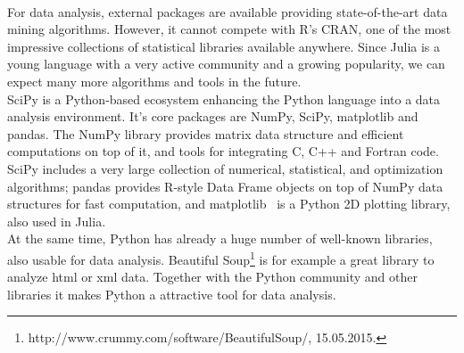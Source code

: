 \\
For data analysis, external packages are available providing state-of-the-art data mining algorithms. However, it cannot compete with R's CRAN, one of the most impressive collections of statistical libraries available anywhere. Since Julia is a young language with a very active community and a growing popularity, we can expect many more algorithms and tools in the future.
\\
SciPy is a Python-based ecosystem enhancing the Python language into a data analysis environment. It's core packages are NumPy, SciPy, matplotlib and pandas. The NumPy library provides matrix data structure and efficient computations on top of it, and tools for integrating C, C++ and Fortran code.
SciPy includes a very large collection of numerical, statistical, and optimization algorithms; pandas provides R-style Data Frame objects on top of NumPy data structures for fast computation, and matplotlib~\parencite{Hunter:2007} is a Python 2D plotting library, also used in Julia. 
\\
At the same time, Python has already a huge number of well-known libraries, also usable for data analysis. Beautiful Soup\footnote{http://www.crummy.com/software/BeautifulSoup/, 15.05.2015.} is for example a great library to analyze html or xml data. Together with the Python community and other libraries it makes Python a attractive tool for data analysis.


